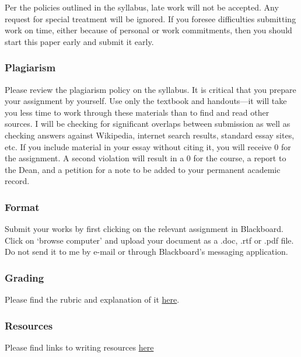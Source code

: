 \documentclass[]{article}
\begin{document}
Per the policies outlined in the syllabus, late work will not be
accepted. Any request for special treatment will be ignored. If you
foresee difficulties submitting work on time, either because of personal
or work commitments, then you should start this paper early and submit
it early.

\subsubsection{Plagiarism}\label{plagiarism}

Please review the plagiarism policy on the syllabus. It is critical that
you prepare your assignment by yourself. Use only the textbook and
handouts---it will take you less time to work through these materials
than to find and read other sources. I will be checking for significant
overlaps between submission as well as checking answers against
Wikipedia, internet search results, standard essay sites, etc. If you
include material in your essay without citing it, you will receive 0 for
the assignment. A second violation will result in a 0 for the course, a
report to the Dean, and a petition for a note to be added to your
permanent academic record.

\subsubsection{Format}\label{format}

Submit your works by first clicking on the relevant assignment in
Blackboard. Click on `browse computer' and upload your document as a
.doc, .rtf or .pdf file. Do not send it to me by e-mail or through
Blackboard's messaging application.

\subsubsection{Grading}\label{grading}

Please find the rubric and explanation of it
\href{/Teaching/Grading/}{here}.

\subsubsection{Resources}\label{resources}

Please find links to writing resources \href{/Teaching/Resources/}{here}
\end{document}
